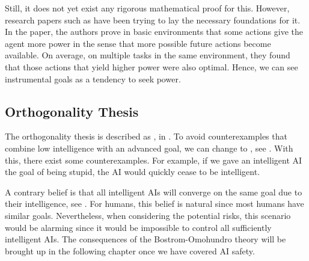 \documentclass[12pt,A4]{report}
\theoremstyle{definition}
\begin{document}

Still, it does not yet exist any rigorous mathematical proof for this. However, research papers such as \citet{Turner19a} have been trying to lay the necessary foundations for it. In the paper, the authors prove in basic environments that some actions give the agent more power in the sense that more possible future actions become available. On average, on multiple tasks in the same environment, they found that those actions that yield higher power were also optimal. Hence, we can see instrumental goals as a tendency to seek power.


\subsection{Orthogonality Thesis}
The orthogonality thesis is described as , in \citet{Bostrom12}. To avoid counterexamples that combine low intelligence with an advanced goal, we can change  to , see \citet{Haggstrom19}. With this, there exist some counterexamples. For example, if we gave an intelligent AI the goal of being stupid, the AI would quickly cease to be intelligent.

A contrary belief is that all intelligent AIs will converge on the same goal due to their intelligence, see \citet{MullerCannon}. For humans, this belief is natural since most humans have similar goals. Nevertheless, when considering the potential risks, this scenario would be alarming since it would be impossible to control all sufficiently intelligent AIs. The consequences of the Bostrom-Omohundro theory will be brought up in the following chapter once we have covered AI safety.

\end{document}
